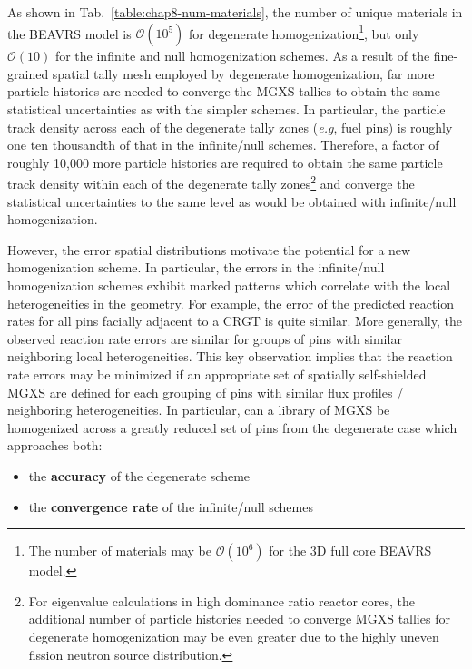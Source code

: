 As shown in Tab.~\ref{table:chap8-num-materials}, the number of unique materials in the \ac{BEAVRS} model is $\mathcal{O}(10^{5})$ for degenerate homogenization\footnote{The number of materials may be $\mathcal{O}(10^{6})$ for the 3D full core \ac{BEAVRS} model.}, but only $\mathcal{O}(10)$ for the infinite and null homogenization schemes. As a result of the fine-grained spatial tally mesh employed by degenerate homogenization, far more particle histories are needed to converge the \ac{MGXS} tallies to obtain the same statistical uncertainties as with the simpler schemes. In particular, the particle track density across each of the degenerate tally zones (\textit{e.g}, fuel pins) is roughly one ten thousandth of that in the infinite/null schemes. Therefore, a factor of roughly 10,000 more particle histories are required to obtain the same particle track density within each of the degenerate tally zones\footnote{For eigenvalue calculations in high dominance ratio reactor cores, the additional number of particle histories needed to converge \ac{MGXS} tallies for degenerate homogenization may be even greater due to the highly uneven fission neutron source distribution.} and converge the statistical uncertainties to the same level as would be obtained with infinite/null homogenization.

However, the error spatial distributions motivate the potential for a new homogenization scheme. In particular, the errors in the infinite/null homogenization schemes exhibit marked patterns which correlate with the local heterogeneities in the geometry. For example, the error of the predicted reaction rates for all pins facially adjacent to a \ac{CRGT} is quite similar. More generally, the observed reaction rate errors are similar for groups of pins with similar neighboring local heterogeneities. This key observation implies that the reaction rate errors may be minimized if an appropriate set of spatially self-shielded \ac{MGXS} are defined for each grouping of pins with similar flux profiles / neighboring heterogeneities. In particular, can a library of \ac{MGXS} be homogenized across a greatly reduced set of pins from the degenerate case which approaches both:

\begin{itemize}[noitemsep]
\item the \textbf{accuracy} of the degenerate scheme
\item the \textbf{convergence rate} of the infinite/null schemes
\end{itemize}

